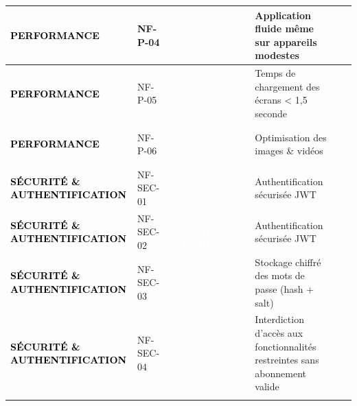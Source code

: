 \begin{longtable}{|P{2.15cm}|P{1.55cm}|P{2.35cm}|P{5.60cm}|P{1.65cm}|P{1.45cm}|}
\textcolor{black}{\textbf{PERFORMANCE}} & NF-P-04 & \textcolor{white}{\textbf{Application Apprenant}} & Application fluide même sur appareils modestes &  &  \\ \hline
{}
\textcolor{black}{\textbf{PERFORMANCE}} & NF-P-05 & \textcolor{white}{\textbf{Application Apprenant}} & Temps de chargement des écrans < 1,5 seconde &  &  \\ \hline
{}
\textcolor{black}{\textbf{PERFORMANCE}} & NF-P-06 & \textcolor{white}{\textbf{Tableau de bord Administrateur}} & Optimisation des images \& vidéos &  &  \\ \hline
{}
\textcolor{black}{\textbf{SÉCURITÉ \& AUTHENTIFICATION}} & NF-SEC-01 & \textcolor{white}{\textbf{Utilisateurs \& Abonnements}} & Authentification sécurisée JWT &  &  \\ \hline
{}
\textcolor{black}{\textbf{SÉCURITÉ \& AUTHENTIFICATION}} & NF-SEC-02 & \textcolor{white}{\textbf{Sécurité, Infrastructure \& RGPD}} & Authentification sécurisée JWT &  &  \\ \hline
{}
\textcolor{black}{\textbf{SÉCURITÉ \& AUTHENTIFICATION}} & NF-SEC-03 & \textcolor{white}{\textbf{Sécurité, Infrastructure \& RGPD}} & Stockage chiffré des mots de passe (hash + salt) &  &  \\ \hline
{}
\textcolor{black}{\textbf{SÉCURITÉ \& AUTHENTIFICATION}} & NF-SEC-04 & \textcolor{white}{\textbf{Utilisateurs \& Abonnements}} & Interdiction d’accès aux fonctionnalités restreintes sans abonnement valide &  &  \\ \hline
{}

\end{longtable}
